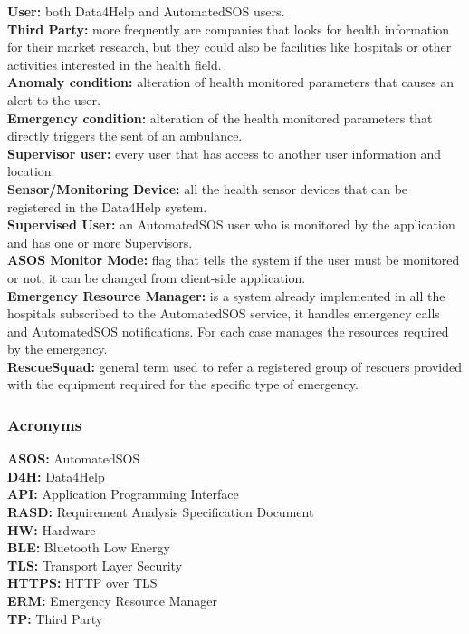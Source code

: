 {{}
{}
\textbf{User:} both Data4Help and AutomatedSOS users.\\
\textbf{Third Party:} more frequently are companies that looks for health information for their market research, but they could also be facilities like hospitals or other activities interested in the health field.  \\ 
\textbf{Anomaly condition:} alteration of health monitored parameters that causes an alert to the user.\\
\textbf{Emergency condition:} alteration of the health monitored parameters that directly triggers the sent of an ambulance.\\
\textbf{Supervisor user:} every user that has access to another user information and location. \\
\textbf{Sensor/Monitoring Device:} all the health sensor devices that can be registered in the Data4Help system.\\
\textbf{Supervised User:} an AutomatedSOS user who is monitored by the application and has one or more Supervisors. \\
\textbf{ASOS Monitor Mode:} flag that tells the system if the user must be monitored or not, it can be changed from client-side application.\\
\textbf{Emergency Resource Manager:} is a system already implemented in all the hospitals subscribed to the AutomatedSOS service, it handles emergency calls and AutomatedSOS notifications. For each case manages the resources required by the emergency. \\
\textbf{RescueSquad:} general term used to refer a registered group of rescuers provided with the equipment required for the specific type of emergency. 

{\color{Blue}\subsubsection{Acronyms}}
\textbf{ASOS:} AutomatedSOS\\
\textbf{D4H:} Data4Help\\
\textbf{API:} Application Programming Interface\\
\textbf{RASD:} Requirement Analysis Specification Document \\
\textbf{HW:} Hardware\\
\textbf{BLE:} Bluetooth Low Energy\\
\textbf{TLS:} Transport Layer Security\\
\textbf{HTTPS:} HTTP over TLS\\
\textbf{ERM:} Emergency Resource Manager\\
\textbf{TP:} Third Party

}
